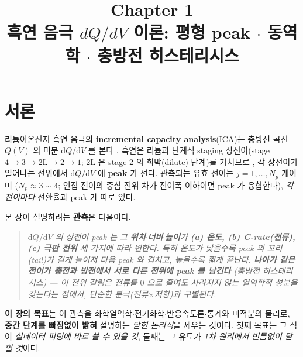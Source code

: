 \documentclass[11pt,a4paper]{article}
\title{\textbf{\LARGE Chapter 1}\\[0.35em]\Large 흑연 음극 $dQ/dV$ 이론: 평형 peak $\cdot$ 동역학 $\cdot$ 충방전 히스테리시스}
\author{}
\date{}
\newcommand{\dd}{\mathrm{d}}
\begin{document}
\maketitle

\section*{서론}
리튬이온전지 흑연 음극의 \textbf{incremental capacity analysis}(ICA)는 충방전 곡선 $Q(V)$ 의 미분
$\dd Q/\dd V$ 를 본다 \cite{bloom2005,dubarry2012}. 흑연은 리튬과 단계적 staging 상전이(stage $4\!\to\!3\!\to\!2\mathrm L\!\to\!2\!\to\!1$;
$2\mathrm L$ 은 stage-2 의 희박(dilute) 단계)를 거치므로 \cite{dahn1991,ohzuku1993,funabiki1999}, 각 상전이가
일어나는 전위에서 $\dd Q/\dd V$ 에 \textbf{peak} 가 선다. 관측되는 유효 전이는 $j=1,\dots,N_p$ 개이며
($N_p\approx3\sim4$; 인접 전이의 중심 전위 차가 전이폭 이하이면 peak 가 융합한다), \emph{각 전이마다} 전환율과
peak 가 따로 있다.

본 장이 설명하려는 \textbf{관측}은 다음이다.
\begin{quote}\itshape
$\dd Q/\dd V$ 의 상전이 peak 는 그 \textbf{위치$\cdot$너비$\cdot$높이}가 \textbf{(a) 온도, (b) C-rate(전류),
(c) 극판 전위} 세 가지에 따라 변한다. 특히 \emph{온도가 낮을수록 peak 의 꼬리(tail)가 길게 늘어져 다음 peak
와 겹치고}, 높을수록 짧게 끝난다. \textbf{나아가 같은 전이가 충전과 방전에서 서로 다른 전위에 peak 를 남긴다}
(\emph{충방전 히스테리시스}) — 이 전위 갈림은 전류를 $0$ 으로 줄여도 \emph{사라지지 않는} 열역학적 성분을 갖는다는
점에서, 단순한 분극(전류$\times$저항)과 구별된다.
\end{quote}

\textbf{이 장의 목표}는 이 관측을 화학열역학$\cdot$전기화학$\cdot$반응속도론$\cdot$통계와 미적분의 물리로,
\textbf{중간 단계를 빠짐없이 밝혀} 설명하는 \emph{닫힌 논리식}을 세우는 것이다.
첫째 목표는 그 식이 \emph{실데이터 피팅에 바로 쓸 수 있을 것}, 둘째는 그 유도가 \emph{1차 원리에서 빈틈없이 닫힐 것}이다.
\end{document}
